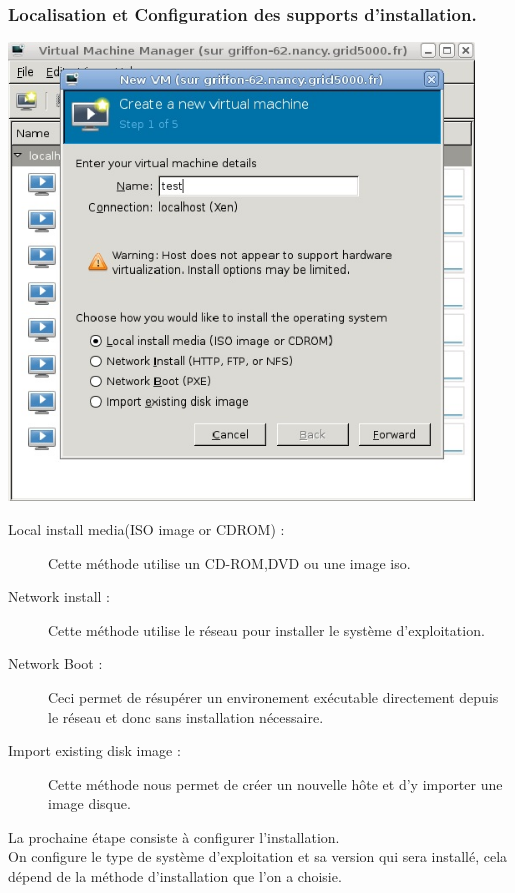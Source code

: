 \subsubsection{Localisation et Configuration des supports d'installation.}
\begin{center}
\includegraphics[width=350pt]{images/nommachine.jpg}
\end{center}
\begin{description}
  \item[Local install media(ISO image or CDROM) :] Cette méthode utilise un CD-ROM,DVD ou une image iso.
  \item[Network install :] Cette méthode utilise le réseau pour installer le système d'exploitation.
  \item[Network Boot :] Ceci permet de résupérer un environement exécutable directement depuis le réseau et donc sans installation nécessaire.
  \item[Import existing disk image :] Cette méthode nous permet de créer un nouvelle hôte et d'y importer une image disque.
\end{description}
La prochaine étape consiste à configurer l'installation.\\
On configure le type de système d'exploitation et sa version qui sera installé, cela dépend de la méthode d'installation que l'on a choisie.
